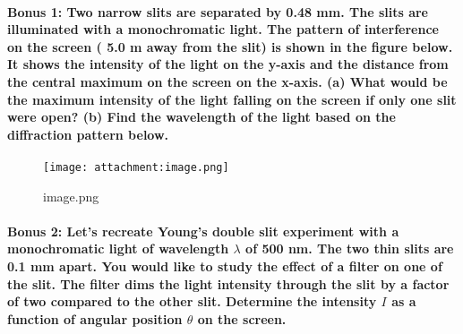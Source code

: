 \documentclass[11pt]{article}
\makeatletter
\def\maxwidth{\ifdim\Gin@nat@width>\linewidth\linewidth
    \else\Gin@nat@width\fi}
\let\Oldincludegraphics\includegraphics
\renewcommand{\includegraphics}[1]{\Oldincludegraphics[width=.8\maxwidth]{#1}}
\makeatother
\begin{document}
    \paragraph{Bonus 1: Two narrow slits are separated by 0.48 mm. The slits
are illuminated with a monochromatic light. The pattern of interference
on the screen ( 5.0 m away from the slit) is shown in the figure below.
It shows the intensity of the light on the y-axis and the distance from
the central maximum on the screen on the x-axis. (a) What would be the
maximum intensity of the light falling on the screen if only one slit
were open? (b) Find the wavelength of the light based on the diffraction
pattern
below.}\label{bonus-1-two-narrow-slits-are-separated-by-0.48-mm.-the-slits-are-illuminated-with-a-monochromatic-light.-the-pattern-of-interference-on-the-screen-5.0-m-away-from-the-slit-is-shown-in-the-figure-below.-it-shows-the-intensity-of-the-light-on-the-y-axis-and-the-distance-from-the-central-maximum-on-the-screen-on-the-x-axis.-a-what-would-be-the-maximum-intensity-of-the-light-falling-on-the-screen-if-only-one-slit-were-open-b-find-the-wavelength-of-the-light-based-on-the-diffraction-pattern-below.}

\begin{figure}[htbp]
\centering
\texttt{[image: attachment:image.png]}
\caption{image.png}
\end{figure}

    \paragraph{\texorpdfstring{Bonus 2: Let's recreate Young's double slit
experiment with a monochromatic light of wavelength \(\lambda\) of 500
nm. The two thin slits are 0.1 mm apart. You would like to study the
effect of a filter on one of the slit. The filter dims the light
intensity through the slit by a factor of two compared to the other
slit. Determine the intensity \(I\) as a function of angular position
\(\theta\) on the
screen.}{Bonus 2: Let's recreate Young's double slit experiment with a monochromatic light of wavelength \textbackslash{}lambda of 500 nm. The two thin slits are 0.1 mm apart. You would like to study the effect of a filter on one of the slit. The filter dims the light intensity through the slit by a factor of two compared to the other slit. Determine the intensity I as a function of angular position \textbackslash{}theta on the screen.}}\label{bonus-2-lets-recreate-youngs-double-slit-experiment-with-a-monochromatic-light-of-wavelength-lambda-of-500-nm.-the-two-thin-slits-are-0.1-mm-apart.-you-would-like-to-study-the-effect-of-a-filter-on-one-of-the-slit.-the-filter-dims-the-light-intensity-through-the-slit-by-a-factor-of-two-compared-to-the-other-slit.-determine-the-intensity-i-as-a-function-of-angular-position-theta-on-the-screen.}


    
    
    
    
\end{document}
